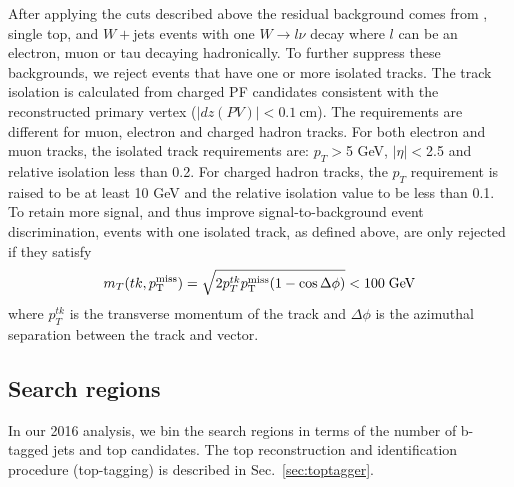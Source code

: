 \begin{itemize}
After applying the cuts described above
the residual background comes from
\ttbar, single top, and $W+$jets events with one $W\rightarrow l\nu$
decay where $l$ can be an electron, muon or tau decaying hadronically. 
To further suppress these backgrounds, we reject events 
that have one or more isolated tracks. The track isolation
is calculated from charged PF candidates consistent with the 
reconstructed primary vertex ($|dz(PV)|<0.1~\mathrm{cm}$).
The requirements are different for muon, electron and charged hadron tracks.
For both electron and muon tracks, the isolated track requirements are: 
$p_{T}>$5 GeV, $|\eta|<$2.5 and relative isolation less than 0.2.
For charged hadron tracks, the $p_{T}$ requirement
is raised to be at least 10 GeV and the relative isolation value to be less 
than 0.1. To retain more signal, and thus improve signal-to-background
event discrimination, events with one isolated track, as defined
above, are only rejected if they satisfy
  \begin{equation}
    \label{eq:mt_isotk}
    m_T(tk,p^{\rm miss}_{\rm T}) = \sqrt{2p_{T}^{tk}p^{\rm miss}_{\rm T}(1-\cos\Delta\phi)}<100\;\mathrm{GeV}
  \end{equation}
  where $p_{T}^{tk}$ is the transverse momentum of the track and
  $\Delta\phi$ is the azimuthal separation between the track and \MET
  vector. 

\end{itemize}

\subsection{Search regions}
\label{sec:searchregions}

In our 2016 analysis, we bin the search regions in terms of the number of b-tagged jets and top candidates. 
The top reconstruction and identification procedure (top-tagging) 
is described in Sec.~\ref{sec:toptagger}. 

